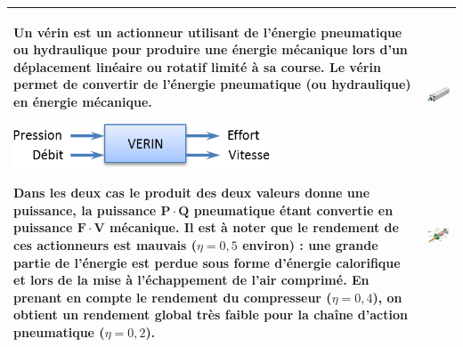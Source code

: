\begin{longtable}[]{@{}
  >{\raggedright\arraybackslash}p{}
  >{\raggedright\arraybackslash}p{}@{}}
\toprule
\endhead
Un vérin est un actionneur utilisant de l'énergie pneumatique ou
hydraulique pour produire une énergie mécanique lors d'un déplacement
linéaire ou rotatif limité à sa course. Le vérin permet de convertir de
l'énergie pneumatique (ou hydraulique) en énergie mécanique.

\includegraphics[width=2.9994in,height=0.52326in]{media/image74.png}

Dans les deux cas le produit des deux valeurs donne une puissance, la
puissance \(\mathbf{P \cdot Q}\) pneumatique étant convertie en
puissance \(\mathbf{F \cdot V}\) mécanique. Il est à noter que le
rendement de ces actionneurs est mauvais (\(\eta = 0,5\) environ) : une
grande partie de l'énergie est perdue sous forme d'énergie calorifique
et lors de la mise à l'échappement de l'air comprimé. En prenant en
compte le rendement du compresseur (\(\eta = 0,4\)), on obtient un
rendement global très faible pour la chaîne d'action pneumatique
(\(\eta = 0,2\)). &
\includegraphics[width=1.60465in,height=1.07872in]{media/image75.png}

\includegraphics[width=2.54651in,height=1.82389in]{media/image76.png} \\
\bottomrule
\end{longtable}

